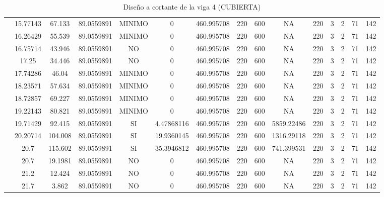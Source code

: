 \begin{table}[H]
{\begin{tabular}{|c|c|c|c|c|c|c|c|c|c|c|c|c|c|c|}
\cline{2-15}    & 15.77143 & 67.133 & 89.0559891 & MINIMO & 0   & 460.995708 & 220 & 600 & NA  & 220 & 3   & 2   & 71  & 142 \bigstrut\\
\cline{2-15}    & 16.26429 & 55.539 & 89.0559891 & MINIMO & 0   & 460.995708 & 220 & 600 & NA  & 220 & 3   & 2   & 71  & 142 \bigstrut\\
\cline{2-15}    & 16.75714 & 43.946 & 89.0559891 & NO  & 0   & 460.995708 & 220 & 600 & NA  & 220 & 3   & 2   & 71  & 142 \bigstrut\\
\cline{2-15}    & 17.25 & 34.446 & 89.0559891 & NO  & 0   & 460.995708 & 220 & 600 & NA  & 220 & 3   & 2   & 71  & 142 \bigstrut\\
\cline{2-15}    & 17.74286 & 46.04 & 89.0559891 & MINIMO & 0   & 460.995708 & 220 & 600 & NA  & 220 & 3   & 2   & 71  & 142 \bigstrut\\
\cline{2-15}    & 18.23571 & 57.634 & 89.0559891 & MINIMO & 0   & 460.995708 & 220 & 600 & NA  & 220 & 3   & 2   & 71  & 142 \bigstrut\\
\cline{2-15}    & 18.72857 & 69.227 & 89.0559891 & MINIMO & 0   & 460.995708 & 220 & 600 & NA  & 220 & 3   & 2   & 71  & 142 \bigstrut\\
\cline{2-15}    & 19.22143 & 80.821 & 89.0559891 & MINIMO & 0   & 460.995708 & 220 & 600 & NA  & 220 & 3   & 2   & 71  & 142 \bigstrut\\
\cline{2-15}    & 19.71429 & 92.415 & 89.0559891 & SI  & 4.47868116 & 460.995708 & 220 & 600 & 5859.22486 & 220 & 3   & 2   & 71  & 142 \bigstrut\\
\cline{2-15}    & 20.20714 & 104.008 & 89.0559891 & SI  & 19.9360145 & 460.995708 & 220 & 600 & 1316.29118 & 220 & 3   & 2   & 71  & 142 \bigstrut\\
\cline{2-15}    & 20.7 & 115.602 & 89.0559891 & SI  & 35.3946812 & 460.995708 & 220 & 600 & 741.399531 & 220 & 3   & 2   & 71  & 142 \bigstrut\\
\cline{2-15}    & 20.7 & 19.1981 & 89.0559891 & NO  & 0   & 460.995708 & 220 & 600 & NA  & 220 & 3   & 2   & 71  & 142 \bigstrut\\
\cline{2-15}    & 21.2 & 12.424 & 89.0559891 & NO  & 0   & 460.995708 & 220 & 600 & NA  & 220 & 3   & 2   & 71  & 142 \bigstrut\\
\cline{2-15}    & 21.7 & 3.862 & 89.0559891 & NO  & 0   & 460.995708 & 220 & 600 & NA  & 220 & 3   & 2   & 71  & 142 \bigstrut\\
\hline
\end{tabular}%

  }%
    \caption{Diseño a cortante de la viga 4 (CUBIERTA) }
  \label{tab:C VG4 CUB }%
\end{table}%

